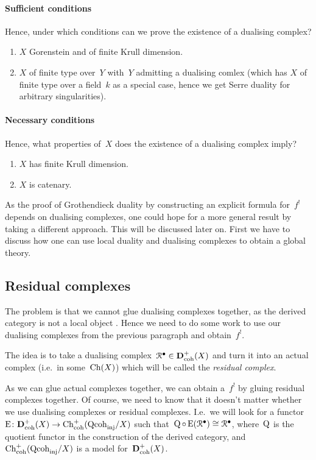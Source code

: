 \documentclass[10pt,a4paper]{article}
\begin{document}
\paragraph{Sufficient conditions}
Hence, under which conditions can we prove the existence of a dualising complex?
\begin{enumerate}
  \item $X$ Gorenstein and of finite Krull dimension.
  \item $X$ of finite type over~$Y$ with~$Y$ admitting a dualising comlex (which has $X$ of finite type over a field~$k$ as a special case, hence we get Serre duality for arbitrary singularities).
\end{enumerate}
\paragraph{Necessary conditions}
Hence, what properties of~$X$ does the existence of a dualising complex imply?
\begin{enumerate}
  \item $X$ has finite Krull dimension.
  \item $X$ is catenary.
\end{enumerate}
As the proof of Grothendieck duality by constructing an explicit formula for~$f^!$ depends on dualising complexes, one could hope for a more general result by taking a different approach. This will be discussed later on. First we have to discuss how one can use local duality and dualising complexes to obtain a global theory.

\subsection{Residual complexes}
\label{subsection:residual-complexes}
The problem is that we cannot glue dualising complexes together, as the derived category is not a local object \cite[page 193]{hartshorne-residues-and-duality}. Hence we need to do some work to use our dualising complexes from the previous paragraph and obtain~$f^!$.

The idea is to take a dualising complex~$\mathcal{R}^\bullet\in\mathbf{D}_{\mathrm{coh}}^+(X)$ and turn it into an actual complex (i.e.\ in some~$\operatorname{Ch}(X)$) which will be called the \emph{residual complex}.

As we can glue actual complexes together, we can obtain a~$f^!$ by gluing residual complexes together. Of course, we need to know that it doesn't matter whether we use dualising complexes or residual complexes. I.e.\ we will look for a functor~$\operatorname{E}\colon\mathbf{D}_{\mathrm{coh}}^+(X)\to\operatorname{Ch}_{\mathrm{coh}}^+(\mathrm{Qcoh}_{\mathrm{inj}}/X)$ such that~$\operatorname{Q}\circ\operatorname{E}(\mathcal{R}^\bullet)\cong\mathcal{R}^\bullet$, where~$\operatorname{Q}$ is the quotient functor in the construction of the derived category, and~$\operatorname{Ch}_{\mathrm{coh}}^+(\mathrm{Qcoh}_{\mathrm{inj}}/X)$ is a model for~$\mathbf{D}_{\mathrm{coh}}^+(X)$.
\end{document}

